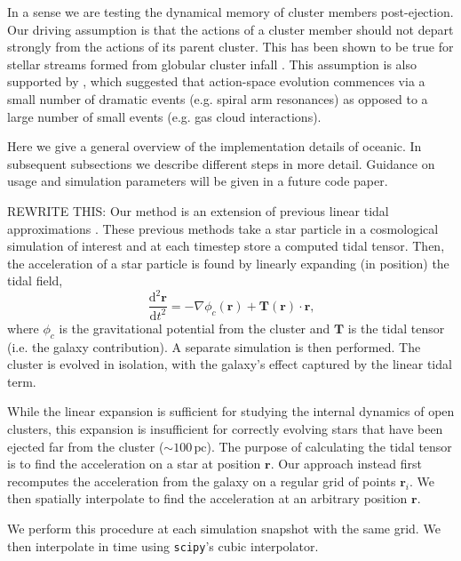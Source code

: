\documentclass[11pt,letterpaper]{article}
\newcommand{\beq}{\begin{equation}}
\newcommand{\eeq}{\end{equation}}
\newcommand{\pc}{\text{pc}}
\newcommand{\dint}{\text{d}}
\begin{document}
\begin{multicols}{2}
In a sense we are testing the dynamical memory of cluster members post-ejection. Our driving assumption is that the actions of a cluster member should not depart strongly from the actions of its parent cluster. This has been shown to be true for stellar streams formed from globular cluster infall \citep{Eyre11:MechTidalStreams}. This assumption is also supported by \citet{Beane18:Actions}, which suggested that action-space evolution commences via a small number of dramatic events (e.g. spiral arm resonances) as opposed to a large number of small events (e.g. gas cloud interactions).


Here we give a general overview of the implementation details of oceanic. In subsequent subsections we describe different steps in more detail. Guidance on usage and simulation parameters will be given in a future code paper.

REWRITE THIS: Our method is an extension of previous linear tidal approximations \citep{Renaud11:NBODY6tt,Mamikonyan17:Kira}. These previous methods take a star particle in a cosmological simulation of interest and at each timestep store a computed tidal tensor. Then, the acceleration of a star particle is found by linearly expanding (in position) the tidal field,
\beq\label{eq:tidal_linear}
\frac{\dint^2 \bm{r}}{\dint t^2} = - \nabla \phi_c(\bm{r}) + \bm{T}(\bm{r}) \cdot \bm{r}\text{,}
\eeq
where $\phi_c$ is the gravitational potential from the cluster and $\bm{T}$ is the tidal tensor (i.e. the galaxy contribution). A separate simulation is then performed. The cluster is evolved in isolation, with the galaxy's effect captured by the linear tidal term.

While the linear expansion is sufficient for studying the internal dynamics of open clusters, this expansion is insufficient for correctly evolving stars that have been ejected far from the cluster ($\sim 100\,\pc$). The purpose of calculating the tidal tensor is to find the acceleration on a star at position $\bm{r}$. Our approach instead first recomputes the acceleration from the galaxy on a regular grid of points $\bm{r}_i$. We then spatially interpolate to find the acceleration at an arbitrary position $\bm{r}$.

We perform this procedure at each simulation snapshot with the same grid. We then interpolate in time using \texttt{scipy}'s cubic interpolator.



\end{multicols}
\end{document}
